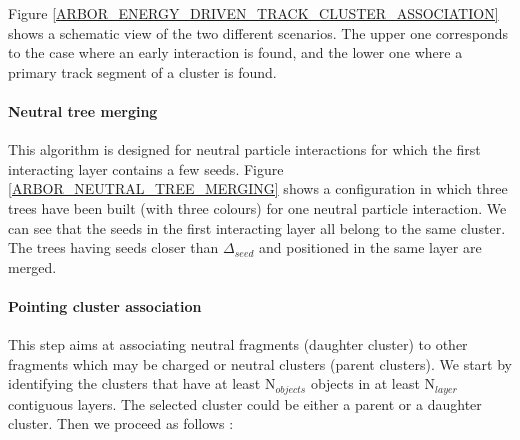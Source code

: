 \documentclass[cits]{JINST}
\begin{document}
Figure \ref{ARBOR_ENERGY_DRIVEN_TRACK_CLUSTER_ASSOCIATION} shows a schematic view of the two different scenarios. The upper one corresponds to the case where an early interaction is found, and the lower one where a primary track segment of a cluster is found.

\paragraph*{Neutral tree merging} This algorithm is designed for neutral particle interactions for which the first interacting layer contains a few seeds. Figure \ref{ARBOR_NEUTRAL_TREE_MERGING} shows a configuration in which three trees have been built (with three colours) for one neutral particle interaction. We can see that the seeds in the first interacting layer all belong to the same cluster. The trees having seeds closer than $\Delta_{seed}$ and positioned in the same layer are merged.

\paragraph*{Pointing cluster association} This step aims at associating neutral fragments (daughter cluster) to other fragments which may be charged or neutral clusters (parent clusters). We start by identifying the clusters that have at least N$_{objects}$ objects in at least N$_{layer}$ contiguous layers. The selected cluster could be either a parent or a daughter cluster. Then we proceed as follows :
\end{document}
